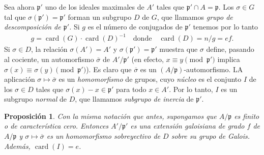 \documentclass[10pt,oneside,bibtotoc,smallheadings,leqno,a5paper,DIV=12]{scrbook}
\newcommand{\idl}[1]{\mathfrak{#1}}
\newcommand{\oline}[1]{\overline{#1}}
\DeclareMathOperator{\card}{card}
\numberwithin{equation}{section}
\theoremstyle{defi}
\theoremstyle{enonce}
\newtheorem{proposition}{Proposici\'on}
\theoremstyle{rem}
\numberwithin{theorem}{section}
\numberwithin{proposition}{section}
\numberwithin{definition}{section}
\numberwithin{lemma}{section}
\numberwithin{corollary}{section}
\numberwithin{example}{section}
\numberwithin{footnote}{section}%
\begin{document}
Sea ahora $\idl{p}'$ uno de los ideales maximales de $A'$ tales que $\idl{p}'\cap A = \idl{p}$. Los $\sigma\in G$
tal que $\sigma(\idl{p}') = \idl{p}'$ forman un subgrupo $D$ de $G$, que llamamos {\em grupo de descomposici\'on de
$\idl{p}'$.} Si $g$ es el n\'umero de conjugados de $\idl{p}'$ tenemos por lo tanto
\begin{gather}\label{eq6.2.2}
g=\card(G)\cdot\card(D)^{-1}\quad\text{donde}\quad\card(D) = n/g = ef.
\end{gather}
Si $\sigma\in D$, la relaci\'on $\sigma(A') = A'$ y $\sigma(\idl{p}') = \idl{p}'$ muestra que $\sigma$ define,
pasando al cociente, un automorfismo $\oline\sigma$ de $A'/\idl{p}'$ (en efecto,
$x\equiv y\pmod{\idl{p}'}$ implica $\sigma(x)\equiv\sigma(y)\pmod{\idl{p}'}$). Es claro que $\oline\sigma$
es un $(A/\idl{p})$-automorfismo. LA aplicaci\'on $\sigma\mapsto\oline\sigma$ es un {\em homomorfismo} de grupos,
cuyo {\em n\'ucleo} es el conjunto $I$ de los $\sigma\in D$ tales que $\sigma(x)-x\in\idl{p}'$ para todo $x\in A'$.
Por lo tanto, $I$ es un subgrupo {\em normal} de $D$, que llamamos {\em subgrupo de inercia} de $\idl{p}'$.

\begin{proposition}\label{prop6.2.2}
Con la misma notaci\'on que antes, supongamos que $A/\idl{p}$ es finito o de caracter\'istica cero. Entonces
$A'/\idl{p}'$ es una extensi\'on galoisiana de grado $f$ de $A/\idl{p}$ y $\sigma\mapsto\oline\sigma$ es un
homomorfismo sobreyectivo de $D$ sobre su grupo de Galois. Adem\'as, $\card(I) = e$.
\end{proposition}
\end{document}
